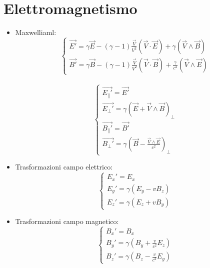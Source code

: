\documentclass[a4paper]{article}
\begin{document}
    \section{Elettromagnetismo}
        \begin{itemize}
            \item Maxwelliaml:\\
                $$\begin{cases}
                    \vec{E'}=\gamma\vec{E}-(\gamma-1)\frac{\vec{V}}{V^2}(\vec{V}\cdot\vec{E})+\gamma(\vec{V}\wedge\vec{B})\\
                    \vec{B'}=\gamma\vec{B}-(\gamma-1)\frac{\vec{V}}{V^2}(\vec{V}\cdot\vec{B})+\frac{\gamma}{c^2}(\vec{V}\wedge\vec{E})
                \end{cases}$$\\
                $$\begin{cases}
                    \vec{E_\|'}=\vec{E'}\\
                    \vec{E_\perp'}=\gamma(\vec{E}+\vec{V}\wedge\vec{B})_\perp\\
                    \vec{B_\|'}=\vec{B'}\\
                    \vec{B_\perp'}=\gamma(\vec{B}-\frac{\vec{V}\wedge\vec{E}}{c^2})_\perp
                \end{cases}$$
            \item Trasformazioni campo elettrico:
                $$\begin{cases}
                    E_x'=E_x\\
                    E_y'=\gamma(E_y-vB_z)\\
                    E_z'=\gamma(E_z+vB_y)
                \end{cases}$$
            \item Trasformazioni campo magnetico:
                $$\begin{cases}
                    B_x'=B_x\\
                    B_y'=\gamma\left(B_y+\frac{v}{c^2}E_z\right)\\
                    B_z'=\gamma\left(B_z-\frac{v}{c^2}E_y\right)
                \end{cases}$$\\
        \end{itemize}
\end{document}
